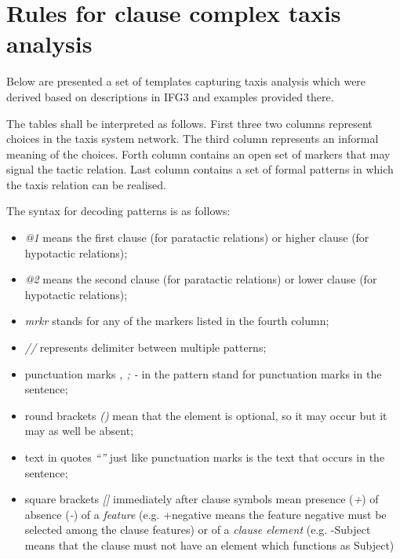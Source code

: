 \chapter{Rules for clause complex taxis analysis}
\label{ch:texis-patterns}
Below are presented a set of templates capturing taxis analysis which were derived based on descriptions in IFG3 \citep{Halliday2004} and examples provided there. 

The tables shall be interpreted as follows. First three two columns represent choices in the taxis system network. The third column represents an informal meaning of the choices. Forth column contains an open set of markers that may signal the tactic relation. Last column contains a set of formal patterns in which the taxis relation can be realised. 

The syntax for decoding patterns is as follows: 
\begin{itemize}
	\item \textit{@1} means the first clause (for paratactic relations) or higher clause (for hypotactic relations); 
	\item \textit{@2} means the second clause (for paratactic relations) or lower clause (for hypotactic relations); 
	\item \textit{mrkr} stands for any of the markers listed in the fourth column;
	\item \textit{//} represents delimiter between multiple patterns;
	\item punctuation marks \textit{, ; -} in the pattern stand for punctuation marks in the sentence;
	\item round brackets \textit{()} mean that the element is optional, so it may occur but it may as well be absent;
	\item text in quotes \textit{``''} just like punctuation marks is the text that occurs in the sentence;
	\item square brackets \textit{[]} immediately after clause symbols mean presence (\textit{+}) of absence (\textit{-}) of a \textit{feature} (e.g. +negative means the feature negative must be selected among the clause features) or of a \textit{clause element} (e.g. -Subject means that the clause must not have an element which functions as Subject)
\end{itemize}

    \clearpage%
    	
